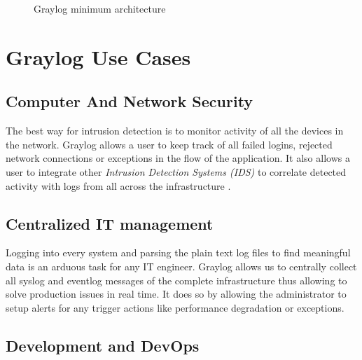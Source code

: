 \documentclass[9pt,twocolumn,twoside]{../../styles/osajnl}
\begin{document}
\begin{figure}[htbp]
\centering
{}
\caption{Graylog minimum architecture \cite{www-graylog-docs}}
\label{fig:Graylog Minimum Architecture}
\end{figure}

\section{Graylog Use Cases}

\subsection{Computer And Network Security}

The best way for intrusion detection is to monitor activity of all the
devices in the network. Graylog allows a user to keep track of all
failed logins, rejected network connections or exceptions in the flow
of the application. It also allows a user to integrate other
\emph{Intrusion Detection Systems (IDS)} \cite{www-ids-wiki} to
correlate detected activity with logs from all across the
infrastructure \cite{www-graylog-org}.

\subsection{Centralized IT management}

Logging into every system and parsing the plain text log files to find
meaningful data is an arduous task for any IT engineer. Graylog allows
us to centrally collect all syslog and eventlog messages of the
complete infrastructure thus allowing to solve production issues in
real time. It does so by allowing the administrator to setup alerts
for any trigger actions like performance degradation or exceptions.

\subsection{Development and DevOps}
\end{document}
